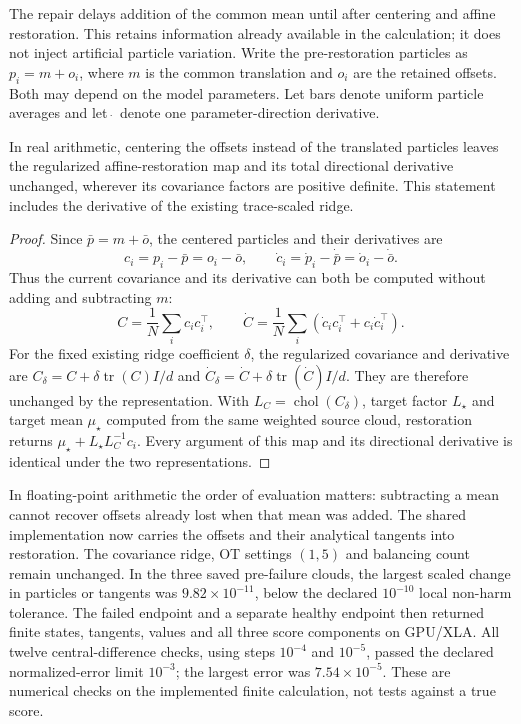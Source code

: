 The repair delays addition of the common mean until after centering and
affine restoration. This retains information already available in the
calculation; it does not inject artificial particle variation. Write the
pre-restoration particles as $p_i=m+o_i$, where $m$ is the common translation
and $o_i$ are the retained offsets. Both may depend on the model parameters.
Let bars denote uniform particle averages and let $\dot{\ }$ denote one
parameter-direction derivative.

\begin{proposition}
\label{prop:sg-offset-restoration}
In real arithmetic, centering the offsets instead of the translated particles
leaves the regularized affine-restoration map and its total directional
derivative unchanged, wherever its covariance factors are positive definite.
This statement includes the derivative of the existing trace-scaled ridge.
\end{proposition}
\begin{proof}
Since $\bar p=m+\bar o$, the centered particles and their derivatives are
\[
 c_i=p_i-\bar p=o_i-\bar o,\qquad
 \dot c_i=\dot p_i-\dot{\bar p}=\dot o_i-\dot{\bar o}.
\]
Thus the current covariance and its derivative can both be computed without
adding and subtracting $m$:
\[
 C=\frac1N\sum_i c_i c_i^\top,\qquad
 \dot C=\frac1N\sum_i
 (\dot c_i c_i^\top+c_i\dot c_i^\top).
\]
For the fixed existing ridge coefficient $\delta$, the regularized covariance
and derivative are $C_\delta=C+\delta\operatorname{tr}(C)I/d$ and
$\dot C_\delta=\dot C+\delta\operatorname{tr}(\dot C)I/d$. They are
therefore unchanged by the representation. With
$L_C=\operatorname{chol}(C_\delta)$, target factor $L_\star$ and target
mean $\mu_\star$ computed from the same weighted source cloud, restoration
returns $\mu_\star+L_\star L_C^{-1}c_i$. Every argument of this map and
its directional derivative is identical under the two representations.
\end{proof}

In floating-point arithmetic the order of evaluation matters: subtracting a
mean cannot recover offsets already lost when that mean was added. The shared
implementation now carries the offsets and their analytical tangents into
restoration. The covariance ridge, OT settings $(1,5)$ and balancing count
remain unchanged. In the three saved pre-failure clouds, the largest scaled
change in particles or tangents was $9.82\times10^{-11}$, below the declared
$10^{-10}$ local non-harm tolerance. The failed endpoint and a separate
healthy endpoint then returned finite states, tangents, values and all three
score components on GPU/XLA. All twelve central-difference checks, using
steps $10^{-4}$ and $10^{-5}$, passed the declared normalized-error limit
$10^{-3}$; the largest error was $7.54\times10^{-5}$. These are numerical
checks on the implemented finite calculation, not tests against a true score.

